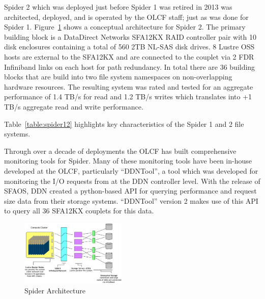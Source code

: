 Spider 2 which was deployed just before Spider 1 was retired in 2013 was architected, deployed, and is operated by the OLCF staff; just as was done for Spider 1. Figure~\ref{fig:arch} shows a conceptual architecture for Spider 2. The primary building block is a DataDirect Networks SFA12KX RAID controller pair with 10 disk enclosures containing a total of 560 2TB NL-SAS disk drives. 8 Lustre OSS hosts are external to the SFA12KX and are connected to the couplet via 2 FDR Infiniband links on each host for path redundancy. In total there are 36 building blocks that are build into two file system namespaces on non-overlapping hardware resources. The resulting system was rated and tested for an aggregate performance of 1.4 TB/s for read and 1.2 TB/s writes which translates into +1 TB/s aggregate read and write performance.

Table~\ref{table:spider12} highlights key characteristics of the Spider 1 and 2 file systems.

Through over a decade of deployments the OLCF has built comprehensive monitoring tools for Spider\cite{olcf-monitoring}. Many of these monitoring tools have been in-house developed at the OLCF, particularly ``DDNTool'', a tool which was developed for monitoring the I/O requests from at the DDN controller level. With the release of SFAOS, DDN created a python-based API for querying performance and request size data from their storage systems. ``DDNTool'' version 2 makes use of this API to query all 36 SFA12KX couplets for this data.


\begin{figure}[!t]
\centering
\includegraphics[width=0.45\textwidth]{./figs/spider2arch.ps}
\vspace{-0.1in}
\centering
\caption{Spider Architecture}
\label{fig:arch}
\end{figure}

